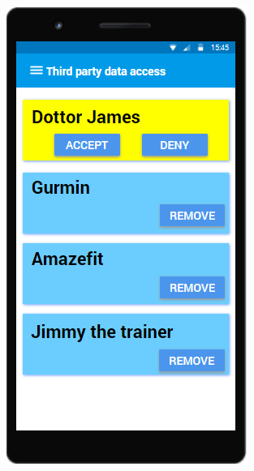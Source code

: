 \begin{figure}[H]
\centering
\begin{minipage}{.5\textwidth}
  \centering
  \includegraphics[width=0.89\linewidth]{resources/Screen/ThirdPartyManagementIndividual.png}
  \label{fig:App ThirdParty Management}
\end{minipage}%
\begin{minipage}{.5\textwidth}
  \centering

\end{minipage}
\end{figure}
